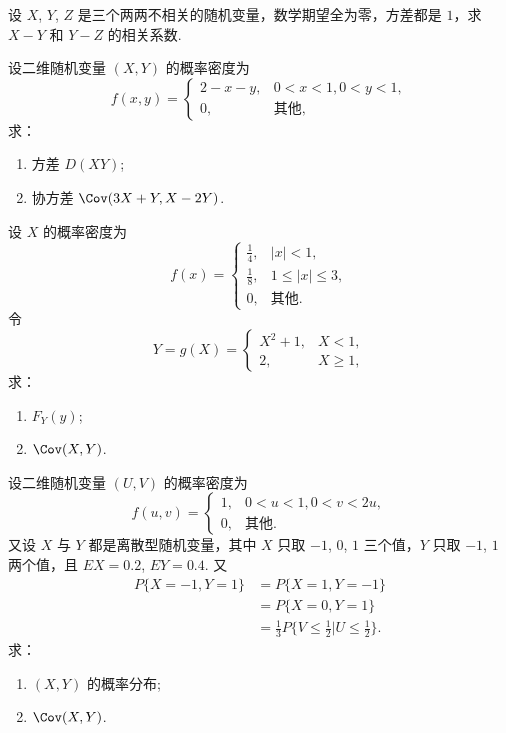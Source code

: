 	\begin{titwo}
		设 $X$, $Y$, $Z$ 是三个两两不相关的随机变量，数学期望全为零，方差都是 $1$，求 $X - Y$ 和 $Y - Z$ 的相关系数.
	\end{titwo}

	\begin{titwo}
		设二维随机变量 $(X,Y)$ 的概率密度为
		\[
			f(x,y) = \begin{cases}
				2 - x - y, & 0 < x < 1,0 < y < 1, \\
				0, & \text{其他},
			\end{cases}
		\]
		求：
		\begin{enumerate}
			\item 方差 $D(XY)$;
			\item 协方差 $\Cov(3X + Y, X - 2Y)$.
		\end{enumerate}
	\end{titwo}

	\begin{titwo}
		设 $X$ 的概率密度为
		\[
			f(x) = \begin{cases}
				\frac{1}{4}, & |x| < 1, \\
				\frac{1}{8}, & 1 \leq |x| \leq 3, \\
				0, & \text{其他}.
			\end{cases}
		\]
		令
		\[
			Y = g(X) = \begin{cases}
				X^{2} + 1, & X < 1, \\
				2, & X \geq 1,
			\end{cases}
		\]
		求：
		\begin{enumerate}
			\item $F_{Y}(y)$;
			\item $\Cov(X,Y)$.
		\end{enumerate}
	\end{titwo}

	\begin{titwo}
		设二维随机变量 $(U,V)$ 的概率密度为
		\[
			f(u,v) = \begin{cases}
				1, & 0 < u < 1, 0 < v < 2u, \\
				0, & \text{其他}.
			\end{cases}
		\]
		又设 $X$ 与 $Y$ 都是离散型随机变量，其中 $X$ 只取 $-1$, $0$, $1$ 三个值，$Y$ 只取 $-1$, $1$ 两个值，且 $EX = 0.2$, $EY = 0.4$. 又
		\begin{align*}
			P\{X = -1,Y = 1\} &= P\{X = 1,Y = -1\}\\
												&= P\{X = 0,Y = 1\}\\
												&= \frac{1}{3} P\Biggl\{ V \leq \frac{1}{2} \Biggl| U \leq \frac{1}{2} \Biggr\}.
		\end{align*}
		求：
		\begin{enumerate}
			\item $(X,Y)$ 的概率分布;
			\item $\Cov(X,Y)$.
		\end{enumerate}
	\end{titwo}

